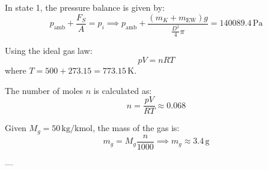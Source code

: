 In state 1, the pressure balance is given by:  
\[
p_{\text{amb}} + \frac{F_S}{A} = p_i \implies p_{\text{amb}} + \frac{(m_K + m_{\text{EW}}) g}{\frac{D^2}{4} \pi} = 140089.4 \, \text{Pa}
\]  

Using the ideal gas law:  
\[
p V = n R T
\]  
where \( T = 500 + 273.15 = 773.15 \, \text{K} \).  

The number of moles \( n \) is calculated as:  
\[
n = \frac{p V}{R T} \approx 0.068
\]  

Given \( M_g = 50 \, \text{kg/kmol} \), the mass of the gas is:  
\[
m_g = M_g \frac{n}{1000} \implies m_g \approx 3.4 \, \text{g}
\]  

---